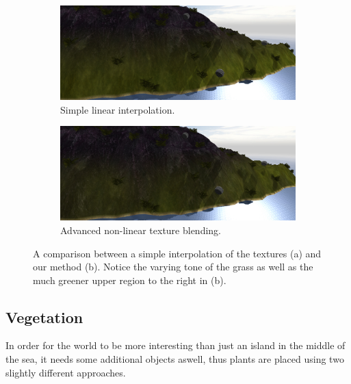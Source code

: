 \newpage
\begin{figure}[H]
\begin{subfigure}{0.9\textwidth}
  \centering
  \includegraphics[width=0.9\linewidth]{images/textureBlendingComparison2_simple.jpg}
  \caption{Simple linear interpolation.}
\end{subfigure}

\begin{subfigure}{0.9\textwidth}
  \centering
  \includegraphics[width=0.9\linewidth]{images/textureBlendingComparison2_advanced.jpg}
  \caption{Advanced non-linear texture blending.}
\end{subfigure}
\label{fig:textureComparison2}
\caption{A comparison between a simple interpolation of the textures (a) and our method (b). Notice the varying tone of the grass as well as the much greener upper region to the right in (b).}
\end{figure}

\newpage
\subsection{Vegetation}
In order for the world to be more interesting than just an island in the middle of the sea, it needs some additional objects aswell, thus plants are placed using two slightly different approaches.

